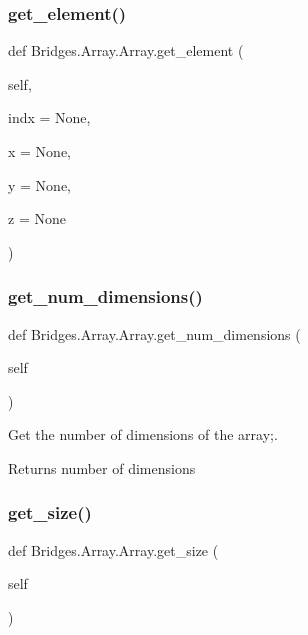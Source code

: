 \subsubsection{\texorpdfstring{get\+\_\+element()}{get\_element()}}
{\footnotesize\ttfamily def Bridges.\+Array.\+Array.\+get\+\_\+element (\begin{DoxyParamCaption}\item[{}]{self,  }\item[{}]{indx = {\ttfamily None},  }\item[{}]{x = {\ttfamily None},  }\item[{}]{y = {\ttfamily None},  }\item[{}]{z = {\ttfamily None} }\end{DoxyParamCaption})}

\mbox{\label{class_bridges_1_1_array_1_1_array_afa88ea678d74409768912cbb4026b65e}} 
\subsubsection{\texorpdfstring{get\+\_\+num\+\_\+dimensions()}{get\_num\_dimensions()}}
{\footnotesize\ttfamily def Bridges.\+Array.\+Array.\+get\+\_\+num\+\_\+dimensions (\begin{DoxyParamCaption}\item[{}]{self }\end{DoxyParamCaption})}



Get the number of dimensions of the array;. 

\begin{DoxyReturn}{Returns}
number of dimensions 
\end{DoxyReturn}
\mbox{\label{class_bridges_1_1_array_1_1_array_a6b3843b3cd57ab072c7db1ca6c107d1d}} 
\subsubsection{\texorpdfstring{get\+\_\+size()}{get\_size()}}
{\footnotesize\ttfamily def Bridges.\+Array.\+Array.\+get\+\_\+size (\begin{DoxyParamCaption}\item[{}]{self }\end{DoxyParamCaption})}



